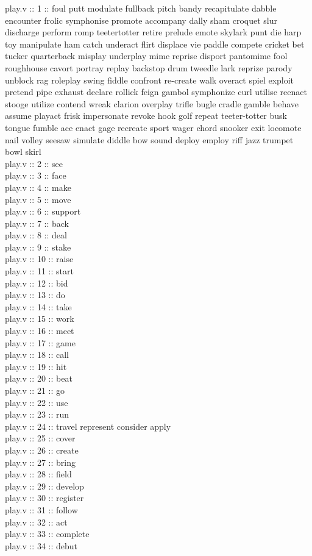 \documentclass[12pt]{article}
\begin{document}
\begin{itemize}
	play.v :: 1 :: foul putt modulate fullback pitch bandy recapitulate dabble encounter frolic symphonise promote accompany dally sham croquet slur discharge perform romp teetertotter retire prelude emote skylark punt die harp toy manipulate ham catch underact flirt displace vie paddle compete cricket bet tucker quarterback misplay underplay mime reprise disport pantomime fool roughhouse cavort portray replay backstop drum tweedle lark reprize parody unblock rag roleplay swing fiddle confront re-create walk overact spiel exploit pretend pipe exhaust declare rollick feign gambol symphonize curl utilise reenact stooge utilize contend wreak clarion overplay trifle bugle cradle gamble behave assume playact frisk impersonate revoke hook golf repeat teeter-totter busk tongue fumble ace enact gage recreate sport wager chord snooker exit locomote nail volley seesaw simulate diddle bow sound deploy employ riff jazz trumpet bowl skirl \\
	play.v :: 2 :: see\\
	play.v :: 3 :: face\\
	play.v :: 4 :: make\\
	play.v :: 5 :: move\\
	play.v :: 6 :: support\\
	play.v :: 7 :: back\\
	play.v :: 8 :: deal\\
	play.v :: 9 :: stake\\
	play.v :: 10 :: raise\\
	play.v :: 11 :: start\\
	play.v :: 12 :: bid\\
	play.v :: 13 :: do\\
	play.v :: 14 :: take\\
	play.v :: 15 :: work\\
	play.v :: 16 :: meet\\
	play.v :: 17 :: game\\
	play.v :: 18 :: call\\
	play.v :: 19 :: hit\\
	play.v :: 20 :: beat \\
	play.v :: 21 :: go\\
	play.v :: 22 :: use\\
	play.v :: 23 :: run\\
	play.v :: 24 :: travel represent consider apply\\
	play.v :: 25 :: cover\\
	play.v :: 26 :: create\\
	play.v :: 27 :: bring\\
	play.v :: 28 :: field\\
	play.v :: 29 :: develop\\
	play.v :: 30 :: register\\
	play.v :: 31 :: follow\\
	play.v :: 32 :: act\\
	play.v :: 33 :: complete \\
	play.v :: 34 :: debut \\
	

\end{itemize}
\end{document}
